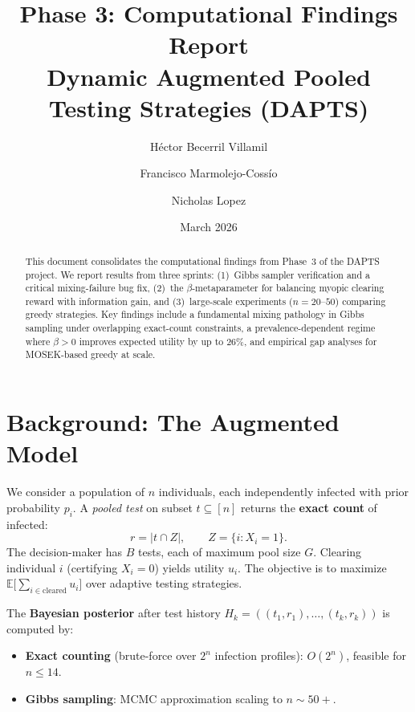 \documentclass[11pt,a4paper]{article}
\title{\textbf{Phase 3: Computational Findings Report} \\[6pt]
\large Dynamic Augmented Pooled Testing Strategies (DAPTS)}
\author{Héctor Becerril Villamil \and Francisco Marmolejo-Cossío \and Nicholas Lopez}
\date{March 2026}
\newcommand{\E}{\mathbb{E}}
\begin{document}
\maketitle

\begin{abstract}
This document consolidates the computational findings from Phase~3 of the DAPTS project.
We report results from three sprints:
(1)~Gibbs sampler verification and a critical mixing-failure bug fix,
(2)~the $\beta$-meta\-parameter for balancing myopic clearing reward with information gain, and
(3)~large-scale experiments ($n=20$--$50$) comparing greedy strategies.
Key findings include a fundamental mixing pathology in Gibbs sampling under overlapping exact-count constraints,
a prevalence-dependent regime where $\beta>0$ improves expected utility by up to 26\%, and
empirical gap analyses for MOSEK-based greedy at scale.
\end{abstract}

\tableofcontents
\newpage

\section{Background: The Augmented Model}

We consider a population of $n$ individuals, each independently infected with prior probability $p_i$.
A \emph{pooled test} on subset $t \subseteq [n]$ returns the \textbf{exact count} of infected:
\[
  r = |t \cap Z|, \qquad Z = \{i : X_i = 1\}.
\]
The decision-maker has $B$ tests, each of maximum pool size $G$.
Clearing individual $i$ (certifying $X_i=0$) yields utility $u_i$.
The objective is to maximize $\E\bigl[\sum_{i \in \text{cleared}} u_i\bigr]$ over adaptive testing strategies.

The \textbf{Bayesian posterior} after test history $H_k = ((t_1,r_1),\ldots,(t_k,r_k))$ is computed by:
\begin{itemize}
  \item \textbf{Exact counting} (brute-force over $2^n$ infection profiles): $O(2^n)$, feasible for $n \leq 14$.
  \item \textbf{Gibbs sampling}: MCMC approximation scaling to $n \sim 50{+}$.
\end{itemize}


\end{document}
